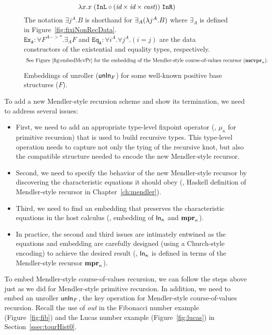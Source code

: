 {\begin{landscape}
\begin{figure}
\[\lambda x. x \;(\texttt{InL}\circ
		(\textit{id}\times\textit{id}\times\textit{cast}))
	\;\texttt{InR})
\]
The notation $\exists j^A.B$ is shorthand for $\exists_A(\lambda j^A.B)$
where $\exists_A$ is defined in Figure~\ref{fig:fixiNonRecData}.\\
$\mathtt{Ex_{A}} : \forall F^{A -> *}.\exists_A F$ and
$\mathtt{Eq_{A}} : \forall i^A.\forall j^A.(i=j)$ are
the data constructors of the existential and equality types, respectively.
\[\text{
See Figure \ref{fig:embedMcvPr} for the embedding of the Mendler-style
course-of-values recursor ($\mathbf{mcvpr}_\kappa$).}
\]
\caption{Embeddings of unroller ($\mathsf{unIn}_F$)
	for some well-known positive base structures ($F$).}
\label{fig:unInExamples}
\end{figure}

\end{landscape}
} %

To add a new Mendler-style recursion scheme and show its termination,
we need to address several issues:
\begin{itemize}
\item First, we need to add an appropriate type-level fixpoint operator
	(\eg, $\mu_\kappa$ for primitive recursion)
that is used to build recursive types. This type-level operation needs to
capture not only the tying of the recursive knot, but also the compatible
structure needed to encode the new Mendler-style recursor.
\item Second, we need to specify the behavior of the new Mendler-style recursor
	by discovering the characteristic equations it should obey
	(\eg, Haskell definition of Mendler-style recursor
	in Chapter~\ref{ch:mendler}).
\item Third, we need to find an embedding that preserves
	the characteristic equations in the host calculus
	(\eg, embedding of $\mathsf{In}_\kappa$ and $\mathbf{mpr}_\kappa$).
\item In practice, the second and third issues are intimately entwined as
the equations and embedding are carefully designed
(using a Church-style encoding) to achieve the desired result
(\eg, $\mathsf{In}_\kappa$ is defined in terms of
	the Mendler-style recursor $\mathbf{mpr}_\kappa$).
\end{itemize}

To embed Mendler-style course-of-values recursion, we can follow
the steps above just as we did for Mendler-style primitive recursion.
In addition, we need to embed an unroller $\mathsf{unIn}_F$, the key operation for
Mendler-style course-of-values recursion. Recall the use of \textit{out} in
the Fibonacci number example (Figure~\ref{fig:fib}) and the Lucas number
example (Figure~\ref{fig:lucas}) in Section~\ref{ssec:tourHist0}.

